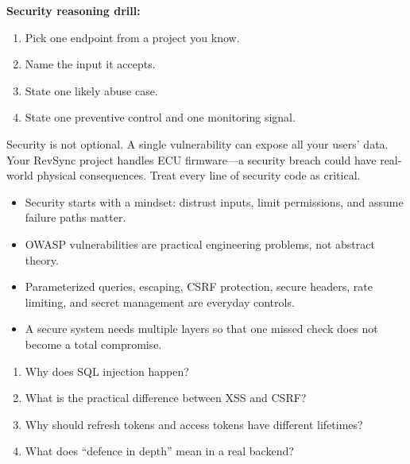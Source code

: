 \documentclass[12pt, a4paper, oneside]{book}
\begin{document}
\begin{exercisebox}
\textbf{Security reasoning drill:}
\begin{enumerate}[leftmargin=2em]
    \item Pick one endpoint from a project you know.
    \item Name the input it accepts.
    \item State one likely abuse case.
    \item State one preventive control and one monitoring signal.
\end{enumerate}
\end{exercisebox}

\begin{cautionbox}
Security is not optional. A single vulnerability can expose all your users' data. Your RevSync project handles ECU firmware---a security breach could have real-world physical consequences. Treat every line of security code as critical.
\end{cautionbox}

\begin{summarybox}
\begin{itemize}[leftmargin=2em]
    \item Security starts with a mindset: distrust inputs, limit permissions, and assume failure paths matter.
    \item OWASP vulnerabilities are practical engineering problems, not abstract theory.
    \item Parameterized queries, escaping, CSRF protection, secure headers, rate limiting, and secret management are everyday controls.
    \item A secure system needs multiple layers so that one missed check does not become a total compromise.
\end{itemize}
\end{summarybox}

\begin{recallbox}
\begin{enumerate}[leftmargin=2em]
    \item Why does SQL injection happen?
    \item What is the practical difference between XSS and CSRF?
    \item Why should refresh tokens and access tokens have different lifetimes?
    \item What does ``defence in depth'' mean in a real backend?
\end{enumerate}
\end{recallbox}
\end{document}
